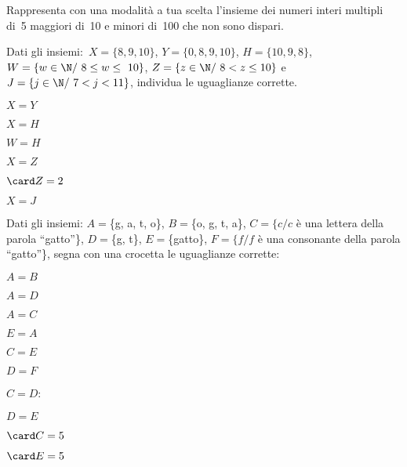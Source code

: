\begin{esercizio}
\label{ese:6.26}
Rappresenta con una modalità a tua scelta l'insieme dei numeri interi 
multipli 
di~5 maggiori di~10 e minori di~100 che non
sono dispari.
\end{esercizio}

\begin{esercizio}
\label{ese:6.27}
Dati gli insiemi:~\(X=\{8, 9, 10\}\), \(Y=\{0, 8, 9, 10\}\), \(H=\{10, 9, 
8\}\),
\(W=\{w\in\N/\ 8\le w\le~10\}\), \(Z=\{z\in\N/\ 8<z\le10\}\) 
e~\(J=\{j\in\N/\ 7<j<11\}\),
individua le uguaglianze corrette.

\vspace{-.6em}
\begin{multicols}{3}
\begin{enumeratea}
\item \(X = Y\)
\item \(X= H\)
\item \(W = H\)
\item \(X = Z\)
\item \(\card Z=2\)
\item \(X = J\)
\end{enumeratea}
\end{multicols}

\vspace{-1em}
\end{esercizio}

\begin{esercizio}
\label{ese:6.28}
Dati gli insiemi:
\(A=\)\{g, a, t, o\}, \(B=\)\{o, g, t, a\}, \(C=\{c/c\) è una lettera della 
parola 
``gatto''\},
\(D=\)\{g, t\}, \(E=\)\{gatto\}, \(F=\{f / f\) è una consonante della parola 
``gatto''\},
segna con una crocetta le uguaglianze corrette:

\vspace{-.6em}
\begin{multicols}{4}
\begin{enumeratea}
 \item \(A = B\)
 \item \(A = D\)
 \item \(A = C\)
 \item \(E = A\)
 \item \(C = E\)
 \item \(D = F\)
 \item \(C = D\):
 \item \(D = E\)
 \columnbreak
 \item \(\card C=5\)
 \item \(\card E=5\)
\end{enumeratea}
\end{multicols}

\vspace{-1em}
\end{esercizio}

